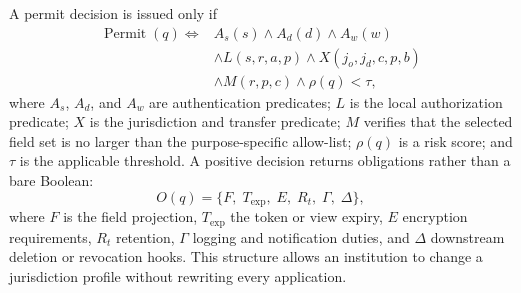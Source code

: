 \documentclass[journal]{IEEEtran}
\begin{document}
A permit decision is issued only if
\begin{equation}
\begin{split}
\operatorname{Permit}(q) \Leftrightarrow {} & A_s(s) \land A_d(d) \land A_w(w) \\
& \land L(s,r,a,p) \land X(j_o,j_d,c,p,b) \\
& \land M(r,p,c) \land \rho(q) < \tau,
\end{split}
\label{eq:permit}
\end{equation}
where $A_s$, $A_d$, and $A_w$ are authentication predicates; $L$ is the local authorization predicate; $X$ is the jurisdiction and transfer predicate; $M$ verifies that the selected field set is no larger than the purpose-specific allow-list; $\rho(q)$ is a risk score; and $\tau$ is the applicable threshold. A positive decision returns obligations rather than a bare Boolean:
\begin{equation}
O(q)=\{F,\;T_{\mathrm{exp}},\;E,\;R_t,\;\Gamma,\;\Delta\},
\end{equation}
where $F$ is the field projection, $T_{\mathrm{exp}}$ the token or view expiry, $E$ encryption requirements, $R_t$ retention, $\Gamma$ logging and notification duties, and $\Delta$ downstream deletion or revocation hooks. This structure allows an institution to change a jurisdiction profile without rewriting every application.
\end{document}

